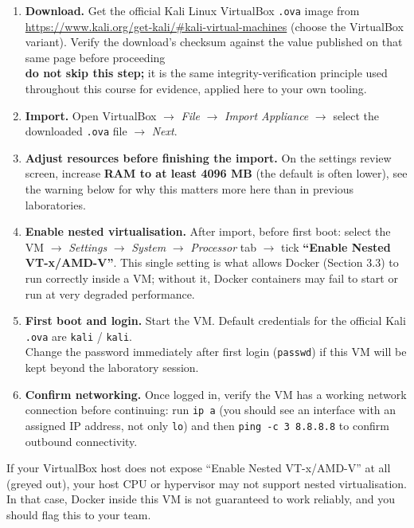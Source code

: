 \begin{enumerate}[leftmargin=1.2cm]
	\item \textbf{Download.} Get the official Kali Linux VirtualBox \texttt{.ova} image from
	      \url{https://www.kali.org/get-kali/#kali-virtual-machines} (choose the VirtualBox
	      variant). Verify the download's checksum against the value published on that same
	      page before proceeding\\
		  \textbf{do not skip this step;} it is the same integrity-verification
	      principle used throughout this course for evidence, applied here to your own tooling.
	\item \textbf{Import.} Open VirtualBox $\rightarrow$ \emph{File} $\rightarrow$ \emph{Import
	      Appliance} $\rightarrow$ select the downloaded \texttt{.ova} file $\rightarrow$
	      \emph{Next}.
	\item \textbf{Adjust resources before finishing the import.} On the settings review screen,
	      increase \textbf{RAM to at least 4096 MB} (the default is often lower), see the
	      warning below for why this matters more here than in previous laboratories.
	\item \textbf{Enable nested virtualisation.} After import, before first boot: select the VM
	      $\rightarrow$ \emph{Settings} $\rightarrow$ \emph{System} $\rightarrow$
	      \emph{Processor} tab $\rightarrow$ tick \textbf{``Enable Nested VT-x/AMD-V''}. This
	      single setting is what allows Docker (Section 3.3) to run correctly inside a VM;
	      without it, Docker containers may fail to start or run at very degraded performance.
	\item \textbf{First boot and login.} Start the VM. Default credentials for the official Kali
	      \texttt{.ova} are \texttt{kali} / \texttt{kali}. \\
		  Change the password immediately after
	      first login (\texttt{passwd}) if this VM will be kept beyond the laboratory session.
	\item \textbf{Confirm networking.} Once logged in, verify the VM has a working network
	      connection before continuing: run \texttt{ip a} (you should see an interface with an
	      assigned IP address, not only \texttt{lo}) and then \texttt{ping -c 3 8.8.8.8} to
	      confirm outbound connectivity.
\end{enumerate}

\begin{warningbox}
If your VirtualBox host does not expose ``Enable Nested VT-x/AMD-V'' at all (greyed out), your
host CPU or hypervisor may not support nested virtualisation. In that case, Docker inside this VM
is not guaranteed to work reliably, and you should flag this to your team.
\end{warningbox}

